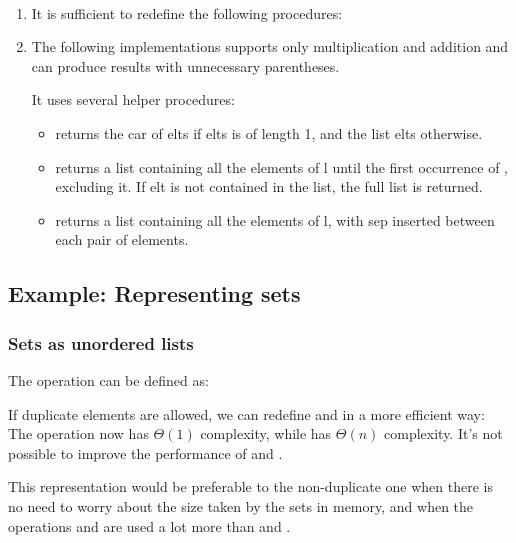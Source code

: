 \begin{exe}[2.58]
    \ \vspace{-20pt}
    \begin{enumerate}
        \item It is sufficient to redefine the following procedures:
        \item The following implementations supports only multiplication and 
            addition and can produce results with unnecessary parentheses.

            It uses several helper procedures:
            \begin{itemize}
                \item {} returns the car of elts if elts 
                    is of length 1, and the list elts otherwise.
                \item {} returns a list containing all 
                    the elements of l until the first occurrence of , 
                    excluding it. If elt is not contained in the list, the full 
                    list is returned.
                \item {} returns a list containing all 
                    the elements of l, with sep inserted between each pair of 
                    elements.
            \end{itemize}
    \end{enumerate}
\end{exe}

\subsection{Example: Representing sets}

\subsubsection{Sets as unordered lists}

\begin{exe}[2.59]
    The  operation can be defined as:
\end{exe}

\begin{exe}[2.60]
    If duplicate elements are allowed, we can redefine  and 
     in a more efficient way:
    The operation  now has $\Theta(1)$ complexity, while 
     has $\Theta(n)$ complexity. It’s not possible to improve 
    the performance of  and .

    This representation would be preferable to the non-duplicate one when there 
    is no need to worry about the size taken by the sets in memory, and when the 
    operations  and  are used a lot more than 
     and .
\end{exe}

